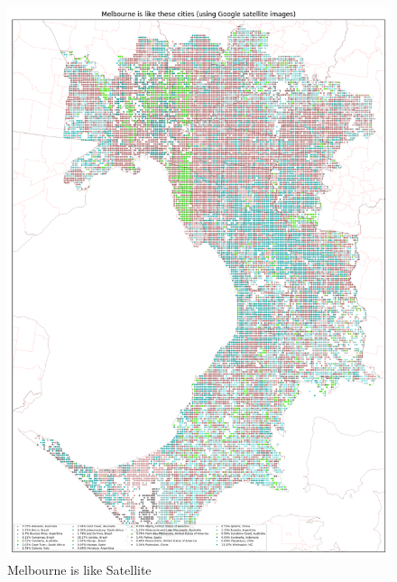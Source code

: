 \documentclass[sageh,times]{sagej}
\begin{document}
\begin{figure}[!htbp]
\includegraphics[scale=0.20]{Images/MelbourneOverallAbrev_sat.png} 
\caption{Melbourne is like Satellite}    
 \label{fig:melsat}  
\end{figure} 
\end{document}
